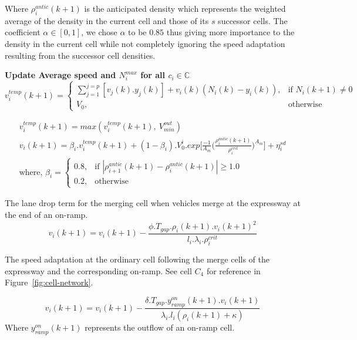 \documentclass{wscpaperproc}
\theoremstyle{wsc}
\begin{document}
Where $\rho_i^{antic}(k+1)$ is the anticipated density which represents the weighted average of the density in the current cell and those of its $s$ successor cells. The coefficient $\alpha\in[0,1]$, we chose $\alpha$ to be $0.85$ thus giving more importance to the density in the current cell while not completely ignoring the speed adaptation resulting from the successor cell densities.


\textbf{Update Average speed and $N_{i}^{max}$ for all $c_i\in \mathbb{C}$}\\


 \begin{equation}
v_i^{temp}(k+1)=
\begin{cases}
\sum\limits_{j=1}^{j=p}[v_{j}(k).y_{j}(k)]+v_i(k)(N_i(k)-y_i(k)), & \text{if } N_i(k+1)\ne 0\\
V_0, & \text{otherwise}
\end{cases}
\end{equation}

\begin{subequations}

\begin{eqnarray}
\label{eq:cell-min}
v_i^{temp}(k+1)=max(v_i^{temp}(k+1),~V^{out}_{min})\\
\label{eq:cell-speed}
v_i(k+1)=\beta_i.v_i^{temp}(k+1)+(1-\beta_i).V_0^i.exp\bigg[\frac{-1}{A_m}\bigg( \frac{\rho_i^{antic}(k+1)}{\rho_i^{crit}}\bigg)^{A_m} \bigg]+\eta_i^{sd}\\
\text{where, }\beta_i=
\begin{cases}
0.8, & \text{if } |\rho_{i+1}^{antic}(k+1)-\rho_i^{antic}(k+1)| \ge 1.0\\
0.2, & \text{otherwise}
\end{cases}
\end{eqnarray}
\end{subequations}

The lane drop term for the merging cell when vehicles merge at the expressway at the end of an on-ramp.
\begin{equation}
\label{eq:lane-drop-term}
v_i(k+1)=v_i(k+1)-\frac{\phi.T_{gap}.\rho_i(k+1).v_i(k+1)^2}{l_i.\lambda_i.\rho_i^{crit}}
\end{equation} 

The speed adaptation at the ordinary cell following the merge cells of the expressway and the corresponding on-ramp. See cell $C_4$ for reference in Figure~\ref{fig:cell-network}.

\begin{equation}
\label{eq:ramp-merge-term}
v_i(k+1)=v_i(k+1)-\frac{\delta.T_{gap}.y^{on}_{ramp}(k+1).v_i(k+1)}{\lambda_i.l_i(\rho_i(k+1)+\kappa)}
\end{equation}
Where $y^{on}_{ramp}(k+1)$ represents the outflow of an on-ramp cell.
\end{document}
